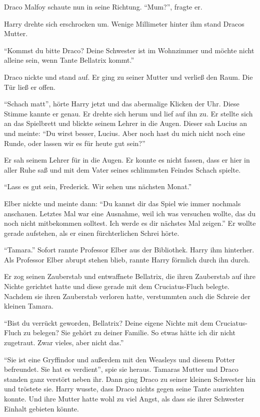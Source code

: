 Draco Malfoy schaute nun in seine Richtung. \enquote{Mum?}, fragte er.

Harry drehte sich erschrocken um. Wenige Millimeter hinter ihm stand Dracos Mutter.

\enquote{Kommst du bitte Draco? Deine Schwester ist im Wohnzimmer und möchte nicht alleine sein, wenn Tante Bellatrix kommt.}

Draco nickte und stand auf. Er ging zu seiner Mutter und verließ den Raum. Die Tür ließ er offen.

\enquote{Schach matt}, hörte Harry jetzt und das abermalige Klicken der Uhr. Diese Stimme kannte er genau. Er drehte sich herum und lief auf ihn zu. Er stellte sich an das Spielbrett und blickte seinem Lehrer in die Augen. Dieser sah Lucius an und meinte: \enquote{Du wirst besser, Lucius. Aber noch hast du mich nicht \gst noch eine Runde, oder lassen wir es für heute gut sein?}

Er sah seinem Lehrer für \VgddK in die Augen. Er konnte es nicht fassen, dass er hier in aller Ruhe saß und mit dem Vater seines schlimmsten Feindes Schach spielte.

\enquote{Lass es gut sein, Frederick. Wir sehen uns nächsten Monat.}

Elber nickte und meinte dann: \enquote{Du kannst dir das Spiel wie immer nochmals anschauen. Letztes Mal war eine Ausnahme, weil ich was versuchen wollte, das du noch nicht mitbekommen solltest. Ich werde es dir nächstes Mal zeigen.} Er wollte gerade aufstehen, als er einen fürchterlichen Schrei hörte.

\enquote{Tamara.} Sofort rannte Professor Elber aus der Bibliothek. Harry ihm hinterher. Als Professor Elber abrupt stehen blieb, rannte Harry förmlich durch ihn durch.

Er zog seinen Zauberstab und entwaffnete Bellatrix, die ihren Zauberstab auf ihre Nichte gerichtet hatte und diese gerade mit dem Cruciatus-Fluch belegte. Nachdem sie ihren Zauberstab verloren hatte, verstummten auch die Schreie der kleinen Tamara.

\enquote{Bist du verrückt geworden, Bellatrix? Deine eigene Nichte mit dem Cruciatus-Fluch zu belegen? Sie gehört zu deiner Familie. So etwas hätte ich dir nicht zugetraut. Zwar vieles, aber nicht das.}

\enquote{Sie ist eine Gryffindor und außerdem mit den Weasleys und diesem Potter befreundet. Sie hat es verdient}, spie sie heraus. Tamaras Mutter und Draco standen ganz verstört neben ihr. Dann ging Draco zu seiner kleinen Schwester hin und tröstete sie. Harry wusste, dass Draco nichts gegen seine Tante ausrichten konnte. Und ihre Mutter hatte wohl zu viel Angst, als dass sie ihrer Schwester Einhalt gebieten könnte.

